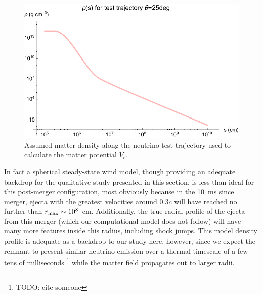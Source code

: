 \documentclass[aps,floatfix,prd,superscriptaddress,twocolumn]{revtex4-1}
\begin{document}
\begin{figure}
  \includegraphics[width=\columnwidth]{profile-density-000Mo-025deg}
  \caption{Assumed matter density along the neutrino test trajectory
    used to calculate the matter potential $V_e$.
    }
  \label{fig:test_traj_density}
\end{figure}

In fact a spherical steady-state wind model, though providing an adequate
backdrop for the qualitative study presented in this section,
is less than ideal for this post-merger configuration,
most obviously because in the 10~ms since merger,
ejecta with the greatest velocities around $0.3c$
will have reached no further than $r_{\rm max} \sim 10^8$~cm.
Additionally, the true radial profile of the ejecta from this merger
(which our computational model does not follow)
will have many more features inside this radius, including shock jumps.
This model density profile is adequate as a backdrop to our study here, however,
since we expect the remnant to present similar neutrino emission over a thermal
timescale of a few tens of milliseconds \footnote{TODO: cite someone}
while the matter field propagates out to larger radii.
\end{document}
